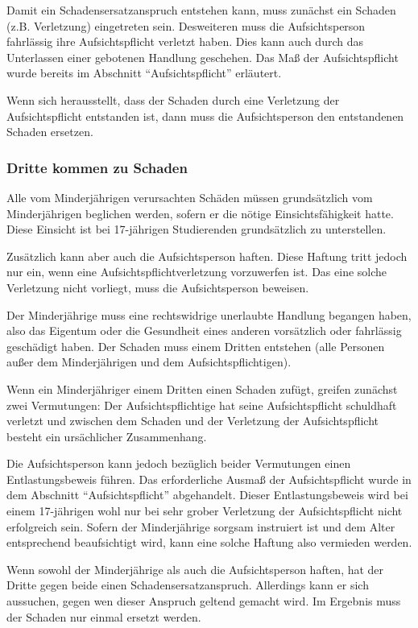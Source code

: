 \documentclass[a4paper,11pt]{scrartcl} %
\begin{document}
Damit ein Schadensersatzanspruch entstehen kann, muss zunächst ein Schaden (z.B. Verletzung) eingetreten sein. Desweiteren muss die Aufsichtsperson fahrlässig ihre Aufsichtspflicht verletzt haben. Dies kann auch durch das Unterlassen einer gebotenen Handlung geschehen. Das Maß der Aufsichtspflicht wurde bereits im Abschnitt "`Aufsichtspflicht"' erläutert.

Wenn sich herausstellt, dass der Schaden durch eine Verletzung der Aufsichtspflicht entstanden ist, dann muss die Aufsichtsperson den entstandenen Schaden ersetzen.

\subsubsection*{Dritte kommen zu Schaden}

Alle vom Minderjährigen verursachten Schäden müssen grundsätzlich vom Minderjährigen beglichen werden, sofern er die nötige Einsichtsfähigkeit hatte. Diese Einsicht ist bei 17-jährigen Studierenden grundsätzlich zu unterstellen.

Zusätzlich kann aber auch die Aufsichtsperson haften. Diese Haftung tritt jedoch nur ein, wenn eine Aufsichtspflichtverletzung vorzuwerfen ist. Das eine solche Verletzung nicht vorliegt, muss die Aufsichtsperson beweisen.

Der Minderjährige muss eine rechtswidrige unerlaubte Handlung begangen haben, also das Eigentum oder die Gesundheit eines anderen vorsätzlich oder fahrlässig geschädigt haben. Der Schaden muss einem Dritten entstehen (alle Personen außer dem Minderjährigen und dem Aufsichtspflichtigen).

Wenn ein Minderjähriger einem Dritten einen Schaden zufügt, greifen zunächst zwei Vermutungen: Der Aufsichtspflichtige hat seine Aufsichtspflicht schuldhaft verletzt und zwischen dem Schaden und der Verletzung der Aufsichtspflicht besteht ein ursächlicher Zusammenhang.

Die Aufsichtsperson kann jedoch bezüglich beider Vermutungen einen Entlastungsbeweis führen. Das erforderliche Ausmaß der Aufsichtspflicht wurde in dem Abschnitt "`Aufsichtspflicht"' abgehandelt. Dieser Entlastungsbeweis wird bei einem 17-jährigen wohl nur bei sehr grober Verletzung der Aufsichtspflicht nicht erfolgreich sein. Sofern der Minderjährige sorgsam instruiert ist und dem Alter entsprechend beaufsichtigt wird, kann eine solche Haftung also vermieden werden.

Wenn sowohl der Minderjährige als auch die Aufsichtsperson haften, hat der Dritte gegen beide einen Schadensersatzanspruch. Allerdings kann er sich aussuchen, gegen wen dieser Anspruch geltend gemacht wird. Im Ergebnis muss der Schaden nur einmal ersetzt werden.
\end{document}
